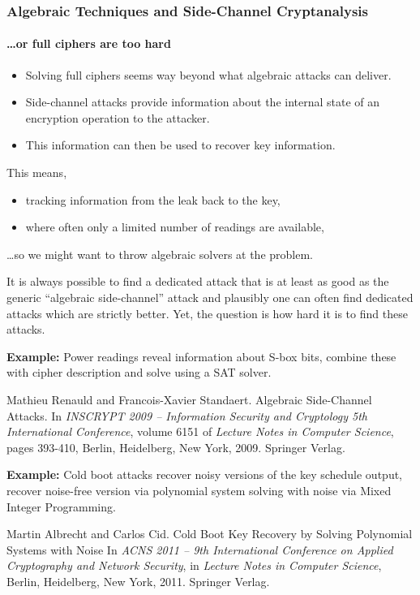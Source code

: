 \documentclass[9pt]{beamer}
\begin{document}
\begin{frame}[allowframebreaks]
\frametitle{Algebraic Techniques and Side-Channel Cryptanalysis}
\framesubtitle{\dots or full ciphers are too hard}

\begin{itemize}
 \item Solving full ciphers seems way beyond what algebraic attacks can deliver.
 \item Side-channel attacks provide information about the internal state of an encryption operation to the attacker.
 \item This information can then be used to recover key information.
\end{itemize}

\framebreak

This means,
\begin{itemize}
 \item tracking information from the leak back to the key,
 \item where often only a limited number of readings are available, 
\end{itemize}
\dots so we might want to throw algebraic solvers at the problem.

\begin{block}{}
It is always possible to find a dedicated attack that is at least as good as the generic ``algebraic side-channel'' attack and plausibly one can often find dedicated attacks which are strictly better. Yet, the question is how hard it is to find these attacks.
\end{block}

\framebreak

\textbf{Example:} Power readings reveal information about S-box bits, combine these with cipher description and solve using a SAT solver.
\vspace{1em}
\begin{thebibliography}{}
Mathieu Renauld and Francois-Xavier Standaert.
\newblock Algebraic Side-Channel Attacks.
\newblock In {\em INSCRYPT 2009 -- {I}nformation {S}ecurity and {C}ryptology 5th International Conference}, volume 6151 of {\em Lecture Notes in Computer Science}, pages 393-410, Berlin, Heidelberg, New York, 2009. Springer Verlag.
\end{thebibliography}
\framebreak

\textbf{Example:} Cold boot attacks recover noisy versions of the key schedule output, recover noise-free version via polynomial system solving with noise via Mixed Integer Programming.
\vspace{1em}
\begin{thebibliography}{}
Martin Albrecht and Carlos Cid.
\newblock Cold Boot Key Recovery by Solving Polynomial Systems with Noise 
\newblock In {\em ACNS 2011 -- 9th International Conference on Applied Cryptography and Network Security}, in {\em Lecture Notes in Computer Science}, Berlin, Heidelberg, New York, 2011. Springer Verlag.
\end{thebibliography}


\end{frame}
\end{document}
